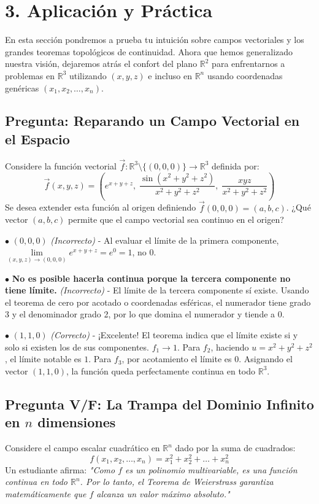 \documentclass[11pt]{article}
\newenvironment{aplicacion}{%
  \section*{3. Aplicación y Práctica}%
}{}
\newenvironment{preguntaalternativas}[1]{\subsection*{Pregunta: #1}\par\vspace{0.1cm}}{\vspace{0.3cm}}
\newcommand{\opcion}[3]{\par\noindent $\bullet$ \textbf{#1} \textit{(#2)} - #3\par\vspace{0.15cm}}
\newenvironment{preguntaverdaderofalso}[1]{\subsection*{Pregunta V/F: #1}\par\vspace{0.1cm}}{\vspace{0.3cm}}
\begin{document}
\begin{aplicacion}
  En esta sección pondremos a prueba tu intuición sobre campos vectoriales y los grandes teoremas topológicos de continuidad. Ahora que hemos generalizado nuestra visión, dejaremos atrás el confort del plano $\mathbb{R}^2$ para enfrentarnos a problemas en $\mathbb{R}^3$ utilizando $(x,y,z)$ e incluso en $\mathbb{R}^n$ usando coordenadas genéricas $(x_1, x_2, \ldots, x_n)$.

  \begin{preguntaalternativas}{Reparando un Campo Vectorial en el Espacio}
    Considere la función vectorial $\vec{f} \colon \mathbb{R}^3 \setminus \{(0,0,0)\} \to \mathbb{R}^3$ definida por:
    $$ \vec{f}(x,y,z) = \left( e^{x+y+z}, \; \displaystyle \dfrac{\sin(x^2+y^2+z^2)}{x^2+y^2+z^2}, \; \displaystyle \dfrac{xyz}{x^2+y^2+z^2} \right) $$
    Se desea extender esta función al origen definiendo $\vec{f}(0,0,0) = (a, b, c)$. ¿Qué vector $(a,b,c)$ permite que el campo vectorial sea continuo en el origen?
    
    \opcion{$(0, 0, 0)$}{Incorrecto}{Al evaluar el límite de la primera componente, $\displaystyle \lim\limits_{(x,y,z)\to(0,0,0)} e^{x+y+z} = e^0 = 1$, no $0$.}
    \opcion{No es posible hacerla continua porque la tercera componente no tiene límite.}{Incorrecto}{El límite de la tercera componente sí existe. Usando el teorema de cero por acotado o coordenadas esféricas, el numerador tiene grado 3 y el denominador grado 2, por lo que domina el numerador y tiende a $0$.}
    \opcion{$(1, 1, 0)$}{Correcto}{¡Excelente! El teorema indica que el límite existe si y solo si existen los de sus componentes. $f_1 \to 1$. Para $f_2$, haciendo $u=x^2+y^2+z^2$, el límite notable es $1$. Para $f_3$, por acotamiento el límite es $0$. Asignando el vector $(1,1,0)$, la función queda perfectamente continua en todo $\mathbb{R}^3$.}
  \end{preguntaalternativas}

  \begin{preguntaverdaderofalso}{La Trampa del Dominio Infinito en $n$ dimensiones}
    Considere el campo escalar cuadrático en $\mathbb{R}^n$ dado por la suma de cuadrados: 
    $$ f(x_1, x_2, \dots, x_n) = x_1^2 + x_2^2 + \dots + x_n^2 $$
    Un estudiante afirma: \textit{"Como $f$ es un polinomio multivariable, es una función continua en todo $\mathbb{R}^n$. Por lo tanto, el Teorema de Weierstrass garantiza matemáticamente que $f$ alcanza un valor máximo absoluto."}
    

\end{preguntaverdaderofalso}
\end{aplicacion}
\end{document}
